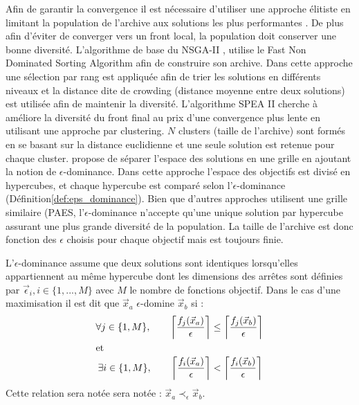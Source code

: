 Afin de garantir la convergence il est nécessaire d’utiliser une approche élitiste
en limitant la population de l’archive aux solutions les plus performantes \parencite{Zitzler2000173}.
De plus afin d’éviter de converger vers un front local, la population doit conserver
une bonne diversité.
L’algorithme de base du NSGA-II \parencite{Deb2002182}, utilise le Fast Non
Dominated Sorting Algorithm afin de construire son archive. Dans cette approche
une sélection par rang est appliquée afin de trier les solutions en différents
niveaux et la distance dite de crowding (distance moyenne entre deux solutions)
est utilisée afin de maintenir la diversité.
L’algorithme SPEA II cherche à améliore la diversité du front final au prix d’une convergence
plus lente en utilisant une approche par clustering. $N$ clusters (taille de l’archive)
sont formés en se basant sur la distance euclidienne et une seule solution est retenue
pour chaque cluster.
\cite{Laumanns2002263} propose de séparer l’espace des solutions en une grille en ajoutant la notion
de $\epsilon$-dominance. Dans cette approche l’espace des objectifs est divisé en hypercubes,
et chaque hypercube est comparé selon l’$\epsilon$-dominance (Définition\ref{def:eps_dominance}).
Bien que d’autres approches utilisent une grille similaire (PAES, \cite{Knowles2000149}
l’$\epsilon$-dominance n’accepte qu’une unique solution par hypercube assurant une
plus grande diversité de la population. La taille de l’archive est donc fonction
des $\epsilon$ choisis pour chaque objectif mais est toujours finie.


\begin{Def}\label{def:eps_dominance}
L’$\epsilon$-dominance assume que deux solutions sont identiques lorsqu’elles appartiennent
au même hypercube dont les dimensions des arrêtes sont définies par
$\vec{\epsilon}_{i}, i \in \{1, ..., M\}$ avec $M$ le nombre de fonctions objectif.
Dans le cas d’une maximisation il est dit que $\vec{x}_{a}$ $\epsilon$-domine $\vec{x}_{b}$ si :
\begin{align*}
  \forall j \in \{1, M\}, \qquad
  \left\lceil\frac{f_{j}(\vec{x}_{a})}{\epsilon}\right\rceil &\leq
  \left\lceil\frac{f_{j}(\vec{x}_{b})}{\epsilon}\right\rceil  \\
  \intertext{et}
  \exists i \in \{1, M\}, \qquad
  \left\lceil\frac{f_{i}(\vec{x}_{a})}{\epsilon}\right\rceil &<
  \left\lceil\frac{f_{i}(\vec{x}_{b})}{\epsilon}\right\rceil  \\
\end{align*}
Cette relation sera notée sera notée : $\vec{x}_{a} \prec_{\epsilon} \vec{x}_{b}$.
\end{Def}

